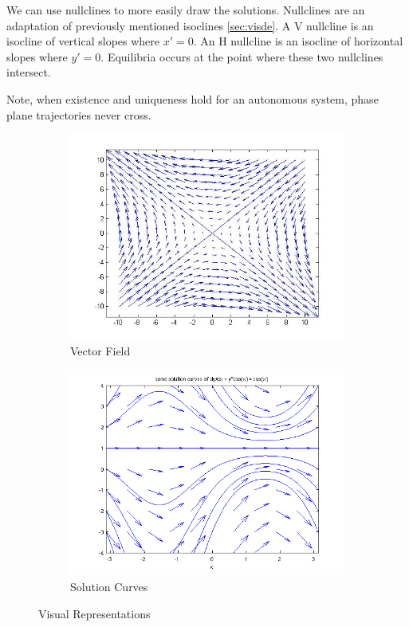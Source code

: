     We can use nullclines to more easily draw the solutions. Nullclines are an adaptation of previously mentioned isoclines \eqref{sec:visde}. A V nullcline is an isocline of vertical slopes where $x\prime = 0$. An H nullcline is an isocline of horizontal slopes where $y\prime = 0$. Equilibria occurs at the point where these two nullclines intersect.

    Note, when existence and uniqueness hold for an autonomous system, phase plane trajectories never cross.

    \begin{figure}[ht]\label{fig:visrep}
    \centering
        \begin{subfigure}[b]{0.4\textwidth}
            \includegraphics[scale=0.25]{./img/vectorfield.png}
            \caption{Vector Field}
        \end{subfigure}
        \begin{subfigure}[b]{0.4\textwidth}
            \includegraphics[scale=0.25]{./img/solutioncurves.png}
            \caption{Solution Curves}
        \end{subfigure}
    \caption{Visual Representations}
    \end{figure}

